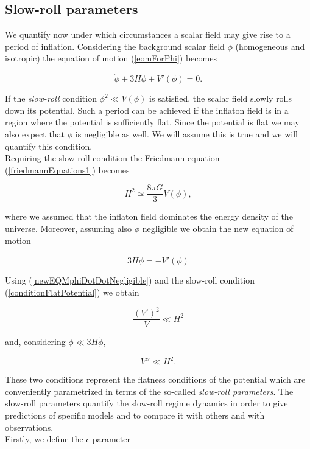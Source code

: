 \documentclass[11pt,a4paper,twoside]{book}
\begin{document}
\subsection{Slow-roll parameters}

We quantify now under which circumstances a scalar field may give rise to a period of inflation.
Considering the background scalar field $ \phi $ (homogeneous and isotropic) the equation of motion (\ref{eomForPhi}) becomes

\begin{equation}
	\label{eomHomogeneousField}
	\ddot{\phi} + 3H \dot{\phi} + V'(\phi) = 0.
\end{equation}

If the \textit{slow-roll} condition $ \phi^{2} \ll V(\phi) $ is satisfied, the scalar field slowly rolls down its potential. Such a period can be achieved if the inflaton field is in a region where the potential is sufficiently flat. Since the potential is flat we may also expect that $\ddot{\phi}$ is negligible as well. We will assume this is true and we will quantify this condition.\\
Requiring the slow-roll condition the Friedmann equation (\ref{friedmannEquations1}) becomes 

\begin{equation}
	\label{friedMannEqDuringInflation}
	H^{2} \simeq \frac{8\pi G}{3} V(\phi),
\end{equation}

where we assumed that the inflaton field dominates the energy density of the universe. Moreover, assuming also $\ddot{\phi}$ negligible we obtain the new equation of motion

\begin{equation}
	\label{newEQMphiDotDotNegligible}
	3H\dot{\phi} = -V'(\phi)
\end{equation}

Using (\ref{newEQMphiDotDotNegligible}) and the slow-roll condition (\ref{conditionFlatPotential}) we obtain

\begin{equation}
	\label{condition1}
	\frac{(V')^{2}}{V} \ll H^{2}
\end{equation}

and, considering $\ddot{\phi} \ll 3H\dot{\phi}$,

\begin{equation}
	\label{condition2}
V'' \ll H^{2}	.
\end{equation}

These two conditions represent the flatness conditions of the potential which are conveniently parametrized in terms of the so-called \textit{slow-roll parameters}.
The slow-roll parameters quantify the slow-roll regime dynamics in order to give predictions of specific models and to compare it with others and with observations.\\
Firstly, we define the $\epsilon$ parameter
\end{document}
